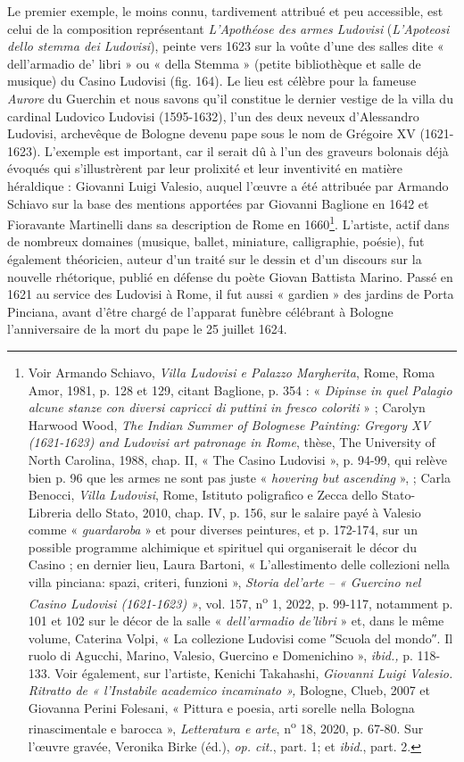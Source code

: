 \documentclass[12pt,twoside,openany]{book}
\begin{document}
Le premier exemple, le moins connu, tardivement attribué et peu accessible, est celui de la composition représentant \textit{L’Apothéose des armes Ludovisi} (\textit{L’Apoteosi dello stemma dei Ludovisi}), peinte vers 1623 sur la voûte d’une des salles dite « dell’armadio de’ libri » ou « della Stemma » (petite bibliothèque et salle de musique) du Casino Ludovisi (fig. 164). Le lieu est célèbre pour la fameuse \textit{Aurore} du Guerchin et nous savons qu’il constitue le dernier vestige de la villa du cardinal Ludovico Ludovisi (1595-1632), l’un des deux neveux d’Alessandro Ludovisi, archevêque de Bologne devenu pape sous le nom de Grégoire XV (1621-1623). L’exemple est important, car il serait dû à l’un des graveurs bolonais déjà évoqués qui s’illustrèrent par leur prolixité et leur inventivité en matière héraldique : Giovanni Luigi Valesio, auquel l’œuvre a été attribuée par Armando Schiavo sur la base des mentions apportées par Giovanni Baglione en 1642 et Fioravante Martinelli dans sa description de Rome en 1660\footnote{Voir Armando Schiavo, \textit{Villa Ludovisi e Palazzo Margherita}, Rome, Roma Amor, 1981, p. 128 et 129, citant Baglione, p. 354 : « \textit{Dipinse in quel Palagio alcune stanze con diversi capricci di puttini in fresco coloriti} » ; Carolyn Harwood Wood, \textit{The Indian Summer of Bolognese Painting: Gregory XV (1621-1623) and Ludovisi art patronage in Rome}, thèse, The University of North Carolina, 1988, chap. II, « The Casino Ludovisi », p. 94-99, qui relève bien p. 96 que les armes ne sont pas juste « \textit{hovering but ascending} », ; Carla Benocci, \textit{Villa Ludovisi}, Rome, Istituto poligrafico e Zecca dello Stato-Libreria dello Stato, 2010, chap. IV, p. 156, sur le salaire payé à Valesio comme « \textit{guardaroba} » et pour diverses peintures, et p. 172-174, sur un possible programme alchimique et spirituel qui organiserait le décor du Casino ; en dernier lieu, Laura Bartoni, « L’allestimento delle collezioni nella villa pinciana: spazi, criteri, funzioni », \textit{Storia del’arte – « Guercino nel Casino Ludovisi (1621-1623) »}, vol. 157, n\textsuperscript{o} 1, 2022, p. 99-117, notamment p. 101 et 102 sur le décor de la salle « \textit{dell’armadio de’libri} » et, dans le même volume, Caterina Volpi, « La collezione Ludovisi come ″Scuola del mondo″. Il ruolo di Agucchi, Marino, Valesio, Guercino e Domenichino », \textit{ibid., }p. 118-133. Voir également, sur l’artiste, Kenichi Takahashi, \textit{Giovanni Luigi Valesio. Ritratto de « l’Instabile academico incaminato »,} Bologne, Clueb, 2007 et Giovanna Perini Folesani, « Pittura e poesia, arti sorelle nella Bologna rinascimentale e barocca », \textit{Letteratura e arte}, n\textsuperscript{o} 18, 2020, p. 67-80. Sur l’œuvre gravée, Veronika Birke (éd.), \textit{op. cit.}, part. 1; et \textit{ibid}., part. 2.}. L’artiste, actif dans de nombreux domaines (musique, ballet, miniature, calligraphie, poésie), fut également théoricien, auteur d’un traité sur le dessin et d’un discours sur la nouvelle rhétorique, publié en défense du poète Giovan Battista Marino. Passé en 1621 au service des Ludovisi à Rome, il fut aussi « gardien » des jardins de Porta Pinciana, avant d’être chargé de l’apparat funèbre célébrant à Bologne l’anniversaire de la mort du pape le 25 juillet 1624.
\end{document}
